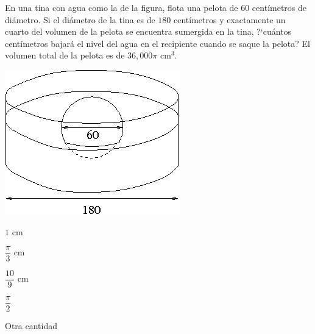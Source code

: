\begin{Solucion}
  
\end{Solucion}

\begin{Problema}{9}
  En una tina con agua como la de la figura, flota una pelota de $60$
  cent\'imetros de di\'ametro. Si el di\'ametro de la tina es de $180$
  cent\'imetros y exactamente un cuarto del volumen de la pelota se
  encuentra sumergida en la tina, ?`cu\'antos cent\'imetros bajar\'a
  el nivel del agua en el recipiente cuando se saque la pelota? El
  volumen total de la pelota es de $36,000\pi$ cm$^3$.

  \begin{center}
    \includegraphics[scale=.58]{OHMballinpool.png}
  \end{center}

  \begin{inparaenum}
  \item $1$ cm\esp
  \item $\dfrac{\pi}{3}$ cm \esp
  \item $\dfrac{10}{9} $ cm\esp
  \item $\dfrac{\pi}{2}$\esp
  \item Otra cantidad
  \end{inparaenum}  
\end{Problema}

\begin{Solucion}
  
\end{Solucion}

